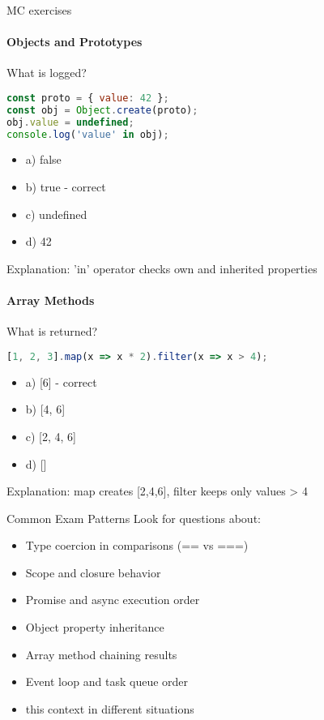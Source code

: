\begin{KR}{MC exercises}
\paragraph{Objects and Prototypes}
What is logged?
\begin{lstlisting}[language=JavaScript, style=basesmol]
const proto = { value: 42 };
const obj = Object.create(proto);
obj.value = undefined;
console.log('value' in obj);
\end{lstlisting}
\begin{itemize}
    \item a) false
    \item b) true - correct
    \item c) undefined
    \item d) 42
\end{itemize}
Explanation: 'in' operator checks own and inherited properties

\paragraph{Array Methods}
What is returned?
\begin{lstlisting}[language=JavaScript, style=basesmol]
[1, 2, 3].map(x => x * 2).filter(x => x > 4);
\end{lstlisting}
\begin{itemize}
    \item a) [6]  - correct
    \item b) [4, 6]
    \item c) [2, 4, 6]
    \item d) []
\end{itemize}
Explanation: map creates [2,4,6], filter keeps only values > 4
\end{KR}

\begin{concept}{Common Exam Patterns}
Look for questions about:
\begin{itemize}
    \item Type coercion in comparisons (== vs ===)
    \item Scope and closure behavior
    \item Promise and async execution order
    \item Object property inheritance
    \item Array method chaining results
    \item Event loop and task queue order
    \item this context in different situations
\end{itemize}
\end{concept}

